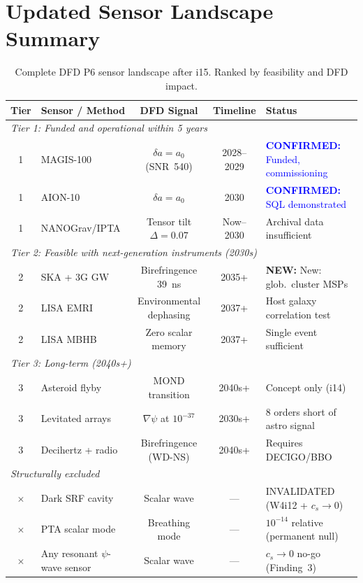 \documentclass[11pt]{article}
\theoremstyle{definition}
\theoremstyle{remark}
\newcommand{\azero}{a_0}
\newcommand{\confirmed}[1]{\textcolor{blue}{\textbf{CONFIRMED:} #1}}
\newcommand{\newresult}[1]{\textcolor{green!50!black}{\textbf{NEW:} #1}}
\begin{document}
\section{Updated Sensor Landscape Summary}
\label{sec:landscape}

\begin{table}[H]
\centering
\small
\caption{Complete DFD P6 sensor landscape after i15. Ranked by
feasibility and DFD impact.}
\label{tab:landscape}
\begin{tabular}{@{}clccl@{}}
\toprule
Tier & Sensor / Method & DFD Signal & Timeline & Status \\
\midrule
\multicolumn{5}{l}{\textit{Tier 1: Funded and operational within 5 years}} \\
1 & MAGIS-100 & $\delta a = \azero$ (SNR~540) & 2028--2029 &
  \confirmed{Funded, commissioning} \\
1 & AION-10 & $\delta a = \azero$ & 2030 &
  \confirmed{SQL demonstrated} \\
1 & NANOGrav/IPTA & Tensor tilt $\Delta = 0.07$ & Now--2030 &
  Archival data insufficient \\
\midrule
\multicolumn{5}{l}{\textit{Tier 2: Feasible with next-generation instruments (2030s)}} \\
2 & SKA + 3G GW & Birefringence 39~ns & 2035+ &
  \newresult{New: glob.\ cluster MSPs} \\
2 & LISA EMRI & Environmental dephasing & 2037+ &
  Host galaxy correlation test \\
2 & LISA MBHB & Zero scalar memory & 2037+ &
  Single event sufficient \\
\midrule
\multicolumn{5}{l}{\textit{Tier 3: Long-term (2040s+)}} \\
3 & Asteroid flyby & MOND transition & 2040s+ &
  Concept only (i14) \\
3 & Levitated arrays & $\nabla\psi$ at $10^{-37}$ & 2030s+ &
  8 orders short of astro signal \\
3 & Decihertz + radio & Birefringence (WD-NS) & 2040s+ &
  Requires DECIGO/BBO \\
\midrule
\multicolumn{5}{l}{\textit{Structurally excluded}} \\
$\times$ & Dark SRF cavity & Scalar wave & --- &
  INVALIDATED (W4i12 + $c_s \to 0$) \\
$\times$ & PTA scalar mode & Breathing mode & --- &
  $10^{-14}$ relative (permanent null) \\
$\times$ & Any resonant $\psi$-wave sensor & Scalar wave & --- &
  $c_s \to 0$ no-go (Finding~3) \\
\bottomrule
\end{tabular}
\end{table}
\end{document}
